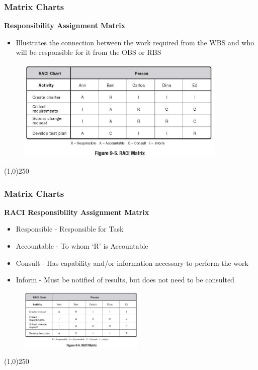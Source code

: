  
\begin{frame}
\frametitle{Matrix Charts}
\textbf{Responsibility Assignment Matrix}
\begin{itemize}
	\item Illustrates the connection between the work required from the WBS and who will be responsible for it from the OBS or RBS
\end{itemize}
\begin{figure}
	\centering
		\includegraphics[width = 10cm]{images/Fig9-5.jpg}
	\label{fig:9-5a}
\end{figure}
\end{frame}\begin{center}\line(1,0){250}\end{center}
 
 
\begin{frame}
\frametitle{Matrix Charts}
\textbf{RACI Responsibility Assignment Matrix}
\begin{itemize} 
	\item Responsible - Responsible for Task
	\item Accountable - To whom `R' is Accountable
	\item Consult - Has capability and/or information necessary to perform the work
	\item Inform - Must be notified of results, but does not need to be consulted
\end{itemize}
\begin{figure}
	\centering
		\includegraphics[width = 6cm]{images/Fig9-5.jpg}
	\label{fig:9-5b}
\end{figure}
\end{frame}\begin{center}\line(1,0){250}\end{center}


